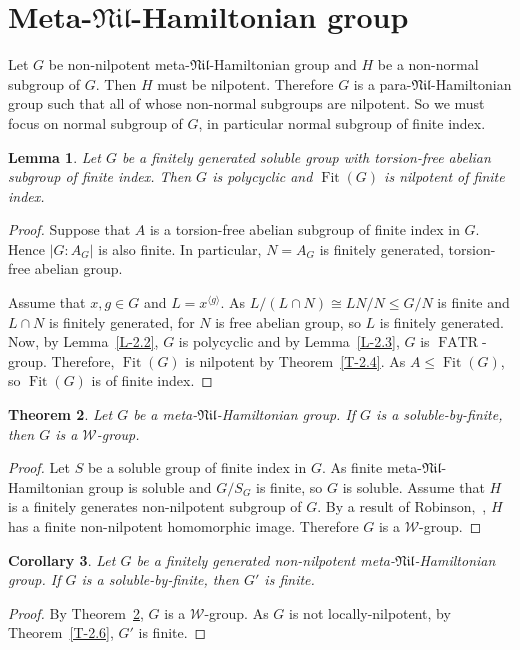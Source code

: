 \documentclass[11pt]{amsart}
\newtheorem{theorem}{Theorem}[section]
\newtheorem{lemma}[theorem]{Lemma}
\newtheorem{corollary}[theorem]{Corollary}
\DeclareMathOperator{\Fit}{Fit}
\DeclareMathOperator{\FATR}{FATR}
\newcommand{\sub}{\leqslant}
\newcommand{\nil}{\mathfrak{Nil}}
\newcommand{\cyc}[1]{\langle #1\rangle}
\begin{document}
\section{ Meta-$\mathfrak{Nil}$-Hamiltonian group}
Let $G$ be non-nilpotent meta-$\nil$-Hamiltonian group and $H$ be a non-normal subgroup of $G$. Then $H$ must be nilpotent. Therefore $G$ is a para-$\nil$-Hamiltonian group such that all of whose non-normal subgroups are nilpotent. So we must focus on normal subgroup of $G$, in particular normal subgroup of finite index.

\begin{lemma}\label{L-3.4}
Let $G$ be a finitely generated soluble group with torsion-free abelian subgroup of finite index. Then $G$ is polycyclic and $\Fit(G)$ is nilpotent of finite index.
\end{lemma}
\begin{proof}
Suppose that $A$ is a torsion-free abelian subgroup of finite index in $G$. Hence $|G: A_G|$ is also finite. In particular, $N=A_G$ is finitely generated, torsion-free abelian group.

Assume that $x, g\in G$ and $L=x^{\cyc{g}}$. As $ L/(L\cap N)\cong LN/N\sub G/N$ is finite and $L\cap N$ is finitely generated, for $N$ is free abelian group, so $L$ is finitely generated. Now, by Lemma~\ref{L-2.2}, $G$ is polycyclic and by Lemma~\ref{L-2.3}, $G$ is $\FATR$-group. Therefore, $\Fit(G)$ is nilpotent by Theorem~\ref{T-2.4}. As $A\sub \Fit(G)$, so $\Fit(G)$ is of finite index.
\end{proof}

\begin{theorem}\label{T-W}
Let  $G$ be a meta-$\mathfrak{Nil}$-Hamiltonian group. If $G$ is a soluble-by-finite, then $G$ is  a $\mathcal{W}$-group. 
\end{theorem}
\begin{proof}
Let $S$ be a soluble group of finite index in $G$. As finite meta-$\mathfrak{Nil}$-Hamiltonian group is soluble and $G/S_G$ is finite, so $G$ is soluble. Assume that $H$ is a finitely generates non-nilpotent subgroup of $G$. By a result of Robinson,~\cite[4.4.4]{LeRob}, $H$ has a finite non-nilpotent homomorphic image. Therefore $G$ is a $\mathcal{W}$-group.
\end{proof}

\begin{corollary}\label{C-3.6}
Let  $G$ be a finitely generated non-nilpotent meta-$\mathfrak{Nil}$-Hamiltonian group. If $G$ is a soluble-by-finite, then $G'$ is finite.
\end{corollary}
\begin{proof}
By Theorem~\ref{T-W}, $G$ is a $\mathcal{W}$-group. As $G$ is not locally-nilpotent, by Theorem~\ref{T-2.6}, $G'$ is finite.
\end{proof}
\end{document}
